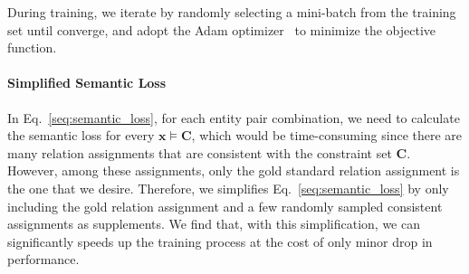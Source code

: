 During training, we iterate by randomly selecting a mini-batch from the training set until converge, and adopt the Adam optimizer~\cite{kingma2014adam} to minimize the objective function.
\paragraph{Simplified Semantic Loss}
In Eq.~\ref{seq:semantic_loss}, for each entity pair combination, we need to calculate the semantic loss for every $\bm x \models \bm{C}$, which would be time-consuming since there are many relation assignments that are consistent with the constraint set $\bm{C}$.
However, among these assignments, only the gold standard relation assignment is the one that we desire.
Therefore, we simplifies Eq.~\ref{seq:semantic_loss} by only including the gold relation assignment and a few randomly sampled consistent assignments as supplements.
We find that, with this simplification, we can significantly speeds up the training process at the cost of only minor drop in performance.





